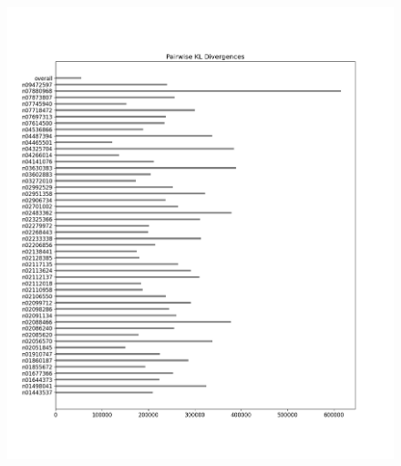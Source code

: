 \documentclass{article}
\begin{document}
\begin{figure}[H]
\begin{minipage}{0.45\textwidth}
        \end{minipage}\hfill
        \begin{minipage}{0.45\textwidth}
            \centering
            \includegraphics[width=\textwidth]{cross_imagenet_imgr_r/alexnet_kl_div_a_to_bpairwise.png} %
        \end{minipage}
        \begin{minipage}{0.45\textwidth}
            \centering

\end{minipage}
\end{figure}
\end{document}
